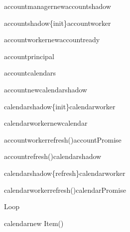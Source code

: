 \documentclass[landscape]{standalone}
\begin{document}
		\centering
		\begin{sequencediagram}
			
				\begin{messcall}{accountmanager}{new}{accountshadow}{}
					\begin{messcall}{accountshadow}{\{init\}}{accountworker}{}
						\begin{call}{accountworker}{new}{account}{ready}
							\begin{callself}{account}{principal}{}
							\end{callself}
							\begin{callself}{account}{calendars}{}
								\begin{messcall}{account}{new}{calendarshadow}{}
									\begin{messcall}{calendarshadow}{\{init\}}{calendarworker}{}
										\begin{messcall}{calendarworker}{new}{calendar}{}
										\end{messcall}
										
									\end{messcall}
								\end{messcall}
							\end{callself}
						\end{call}
						\begin{call}{accountworker}{refresh()}{account}{Promise}
							\begin{messcall}{account}{refresh()}{calendarshadow}{}
								\begin{messcall}{calendarshadow}{\{refresh\}}{calendarworker}{}
									\begin{call}{calendarworker}{refresh()}{calendar}{Promise}
										\begin{sdblock}{Loop}{}
											\begin{callself}{calendar}{new Item()}{}
											\end{callself}
										\end{sdblock}
									\end{call}
								\end{messcall}
							\end{messcall}
						\end{call}
					\end{messcall}
				\end{messcall}
			
			
		\end{sequencediagram}
		
\end{document}
